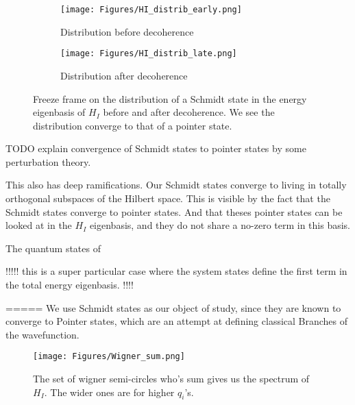 \documentclass{article}
\begin{document}
\begin{figure}[h!]
  \centering
  \begin{subfigure}[b]{0.49\linewidth}
    \texttt{[image: Figures/HI\_distrib\_early.png]}
    \label{fig:1}
    \caption{Distribution before decoherence}
  \end{subfigure}
  \begin{subfigure}[b]{0.49\linewidth}
    \texttt{[image: Figures/HI\_distrib\_late.png]}
    \label{fig:2}
    \caption{Distribution after decoherence}
  \end{subfigure}
  \caption{}
  \label{fig:dist_EI_dep}
  \caption{Freeze frame on the distribution of a Schmidt state in the energy eigenbasis of $H_I$ before and after decoherence. We see the distribution converge to that of a pointer state.}
\end{figure}


TODO explain convergence of Schmidt states to pointer states by some perturbation theory. 

This also has deep ramifications. Our Schmidt states converge to living in totally orthogonal subspaces of the Hilbert space. This is visible by the fact that the Schmidt states converge to pointer states. And that theses pointer states can be looked at in the $H_I$ eigenbasis, and they do not share a no-zero term in this basis.

The quantum states of 

!!!!!
this is a super particular case where the system states define the first term in the total energy eigenbasis. 
!!!!



=====
We use Schmidt states as our object of study, since they are known to converge to Pointer states, which are an attempt at defining classical Branches of the wavefunction.




\begin{figure}[h]
    \centering
    \texttt{[image: Figures/Wigner\_sum.png]}
    \caption{The set of wigner semi-circles who's sum gives us the spectrum of $H_I$. The wider ones are for higher $q_i$'s.}
    \label{fig:wigner_sum}
\end{figure}
\end{document}
